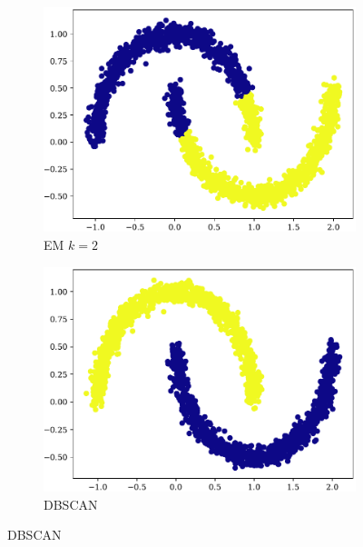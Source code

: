 \begin{figure}[t!]
\begin{subfigure}[b]{0.45\textwidth}
        \includegraphics[width=\textwidth]{../plots/moons_em.pdf}
        \caption{EM $k = 2$}
        \label{subfig:moon-em}
    \end{subfigure}
    \hspace{0.09\textwidth}
    \begin{subfigure}[b]{0.45\textwidth}
        \includegraphics[width=\textwidth]{../plots/moons_dbscan.pdf}
        \caption{DBSCAN}
        \label{subfig:moon-dbscan}
    \end{subfigure}
\end{figure}

